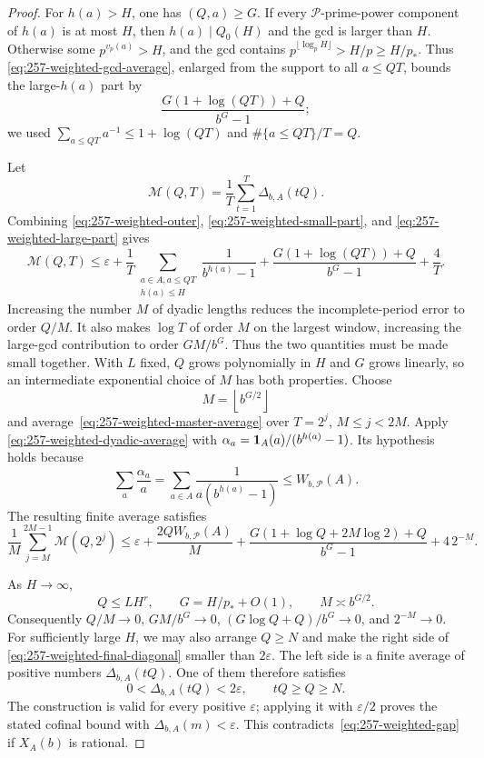 \documentclass[11pt]{article}
\theoremstyle{plain}
\theoremstyle{definition}
\theoremstyle{remark}
\begin{document}
\begin{proof}
For $h(a)>H$, one has $(Q,a)\ge G$.  If every $\mathcal P$-prime-power
component of $h(a)$ is at most $H$, then $h(a)\mid Q_0(H)$ and the gcd is
larger than $H$.  Otherwise some $p^{v_p(a)}>H$, and the gcd contains
$p^{\lfloor\log_pH\rfloor}>H/p\ge H/p_*$.  Thus
\eqref{eq:257-weighted-gcd-average}, enlarged from the support to all
$a\le QT$, bounds the large-$h(a)$ part by
\begin{equation}\label{eq:257-weighted-large-part}
 \frac{G(1+\log(QT))+Q}{b^G-1};
\end{equation}
we used $\sum_{a\le QT}a^{-1}\le1+\log(QT)$ and
$\#\{a\le QT\}/T=Q$.

Let
\[
 \mathcal M(Q,T)=\frac1T\sum_{t=1}^{T}\Delta_{b,A}(tQ).
\]
Combining \eqref{eq:257-weighted-outer},
\eqref{eq:257-weighted-small-part}, and
\eqref{eq:257-weighted-large-part} gives
\begin{equation}\label{eq:257-weighted-master-average}
 \mathcal M(Q,T)\le
 \varepsilon+
 \frac1T\sum_{\substack{a\in A, a\le QT\\h(a)\le H}}
       \frac1{b^{h(a)}-1}
 +\frac{G(1+\log(QT))+Q}{b^G-1}+\frac4T.
\end{equation}
Increasing the number $M$ of dyadic lengths reduces the incomplete-period
error to order $Q/M$. It also makes $\log T$ of order $M$ on the largest
window, increasing the large-gcd contribution to order $GM/b^G$.
Thus the two quantities must be made small together. With $L$ fixed,
$Q$ grows polynomially in $H$ and $G$ grows linearly, so an intermediate
exponential choice of $M$ has both properties.  Choose
\[
 M=\left\lfloor b^{G/2}\right\rfloor
\]
and average~\eqref{eq:257-weighted-master-average} over
$T=2^j$, $M\le j<2M$.  Apply
\eqref{eq:257-weighted-dyadic-average} with
$\alpha_a={\bf1}_A(a)/(b^{h(a)}-1)$.  Its hypothesis holds because
\[
 \sum_a\frac{\alpha_a}{a}
 =\sum_{a\in A}\frac1{a(b^{h(a)}-1)}
 \le W_{b,\mathcal P}(A).
\]
The resulting finite average satisfies
\begin{equation}\label{eq:257-weighted-final-diagonal}
 \frac1M\sum_{j=M}^{2M-1}\mathcal M(Q,2^j)
 \le \varepsilon+\frac{2QW_{b,\mathcal P}(A)}M
 +\frac{G(1+\log Q+2M\log2)+Q}{b^G-1}
 +4\,2^{-M}.
\end{equation}

As $H\to\infty$,
\[
 Q\le LH^r,\qquad G=H/p_*+O(1),\qquad M\asymp b^{G/2}.
\]
Consequently $Q/M\to0$, $GM/b^G\to0$,
$(G\log Q+Q)/b^G\to0$, and $2^{-M}\to0$.  For sufficiently large $H$,
we may also arrange $Q\ge N$ and make the right side of
\eqref{eq:257-weighted-final-diagonal} smaller than $2\varepsilon$.
The left side is a finite average of positive numbers
$\Delta_{b,A}(tQ)$.  One of them therefore satisfies
\[
 0<\Delta_{b,A}(tQ)<2\varepsilon,
 \qquad tQ\ge Q\ge N.
\]
The construction is valid for every positive $\varepsilon$; applying it with
$\varepsilon/2$ proves the stated cofinal bound with $\Delta_{b,A}(m)<\varepsilon$.
This contradicts~\eqref{eq:257-weighted-gap} if $X_A(b)$ is rational.
\end{proof}
\end{document}
